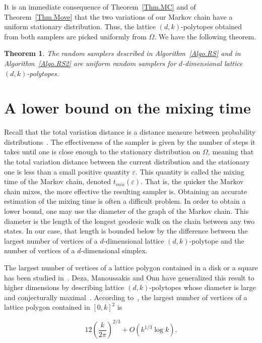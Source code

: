 \documentclass[a4paper]{article}
\newtheorem{theorem}{Theorem}
\begin{document}
It is an immediate consequence of Theorem~\ref{Thm.MC} and of Theorem~\ref{Thm.Move} that the two variations of our Markov chain have a uniform stationary distribution. Thus, the lattice $(d,k)$-polytopes obtained from both samplers are picked uniformly from $\Omega$. We have the following theorem.

\begin{theorem}\label{Thm.RS}
  The random samplers described in Algorithm~\ref{Algo.RS} and in Algorithm~\ref{Algo.RS2} are uniform random samplers for $d$-dimensional lattice $(d,k)$-polytopes.
\end{theorem}

\section{A lower bound on the mixing time}\label{Sec.Mix}

Recall that the total variation distance is a distance measure between probability distributions~\cite{levin2009markov}.
The effectiveness of the sampler is given by the number of steps it takes until one is close enough to the stationary distribution on $\Omega$, meaning that the total variation distance between the current distribution
and the stationary one is less than a small positive quantity $\varepsilon$. This quantity is called the mixing time of the Markov chain, denoted $t_{mix}(\varepsilon)$. That is, the quicker the Markov chain mixes, the more effective the resulting sampler is. Obtaining an accurate estimation of the mixing time is often a difficult problem. In order to obtain a lower bound, one may use the diameter of the graph of the Markov chain. This diameter is the length of the longest geodesic walk on the chain between any two states.
In our case, that length is bounded below by the difference between the largest number of vertices of a $d$-dimensional lattice $(d,k)$-polytope and the number of vertices of a $d$-dimensional simplex.

The largest number of vertices of a lattice polygon contained in a disk or a square has been studied in~\cite{AcketaZunic1995,T91,BB91}. Deza, Manoussakis and Onn have generalized this result to higher dimensions by describing lattice $(d,k)$-polytopes whose diameter is large and conjecturally maximal~\cite{DezaManoussakisOnn2018}. According to~\cite{AcketaZunic1995}, the largest number of vertices of a lattice polygon contained in $[0,k]^2$ is

\begin{equation}\label{Eqn.Deza}
  12\left(\frac{k}{2\pi}\right)^{2/3}+O(k^{1/3}\log{k})\mbox{.}
\end{equation}
\end{document}
